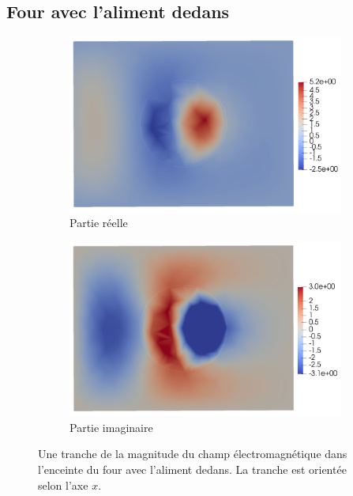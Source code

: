\subsection{Four avec l'aliment dedans}

\begin{figure}[H]
    \centering
    \begin{subfigure}{.5\textwidth}
        \centering
        \includegraphics[scale=0.15]{figures/helmholtz/helmholtz_reel1.png}
        \caption{Partie réelle}
    \end{subfigure}%
    \begin{subfigure}{.5\textwidth}
        \centering
        \includegraphics[scale=0.15]{figures/helmholtz/helmholtz_imag1.png}
        \caption{Partie imaginaire}
    \end{subfigure}
    \caption{Une tranche de la magnitude du champ électromagnétique dans l'enceinte
    du four avec l'aliment dedans. La tranche est orientée selon l'axe $x$.}
\end{figure}

